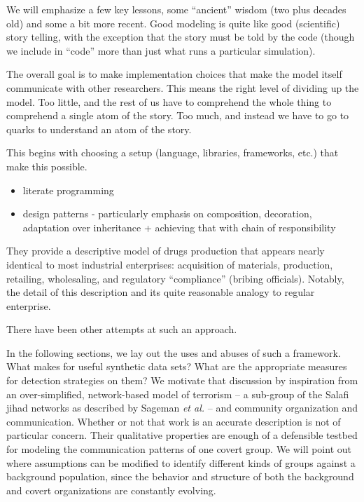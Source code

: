 \documentclass{article}
\begin{document}
We will emphasize a few key lessons, some ``ancient'' wisdom (two plus decades old) and some a bit more recent.  Good modeling is quite like good (scientific) story telling, with the exception that the story must be told by the code (though we include in ``code'' more than just what runs a particular simulation).

The overall goal is to make implementation choices that make the model itself communicate with other researchers.  This means the right level of dividing up the model.  Too little, and the rest of us have to comprehend the whole thing to comprehend a single atom of the story.  Too much, and instead we have to go to quarks to understand an atom of the story.

This begins with choosing a setup (language, libraries, frameworks, etc.) that make this possible.


\begin{itemize}
\item literate programming
\item design patterns - particularly emphasis on composition, decoration, adaptation over inheritance + achieving that with chain of responsibility 
\end{itemize}


They provide a descriptive model of drugs production that appears nearly identical to most industrial enterprises: acquisition of materials, production, retailing, wholesaling, and regulatory ``compliance'' (bribing officials).  Notably, the detail of this description and its quite reasonable analogy to regular enterprise.

There have been other attempts at such an approach\cite{carley2003dynamic}.

In the following sections, we lay out the uses and abuses of such a framework.  What makes for useful synthetic data sets?  What are the appropriate measures for detection strategies on them?  We motivate that discussion by inspiration from an over-simplified, network-based model of terrorism -- a sub-group of the Salafi jihad networks as described by Sageman {\em et al.}\cite{sageman} -- and community organization and communication.  Whether or not that work is an accurate description is not of particular concern.  Their qualitative properties are enough of a defensible testbed for modeling the communication patterns of one covert group.  We will point out where assumptions can be modified to identify different kinds of groups against a background population, since the behavior and structure of both the background and covert organizations are constantly evolving. 
\end{document}
